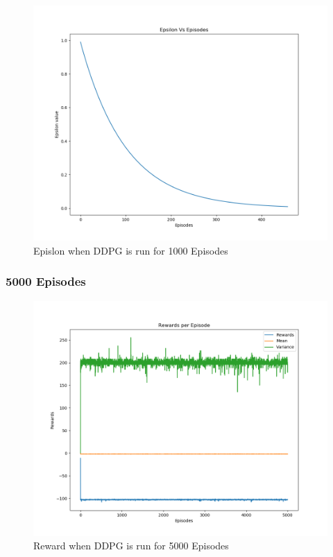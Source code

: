 \documentclass[doc, onecolumn, 12pt]{apa6}
\begin{document}
\begin{figure}
\label{DDPG_1000Ep_Epsilon}
\includegraphics[width =\textwidth, height=0.4 \textheight]{results/ddpg/1000_ep/Epsilon.png}
\caption{Epislon when DDPG is run for 1000 Episodes}
\end{figure}

\FloatBarrier 

\subsubsection{5000 Episodes}


\begin{figure}
\label{DDPG_5000Ep_Rewards}
\includegraphics[width =\textwidth, height=0.4 \textheight]{results/ddpg/5000_ep/Rewards.png}
\caption{Reward when DDPG is run for 5000 Episodes}
\end{figure}
\end{document}
